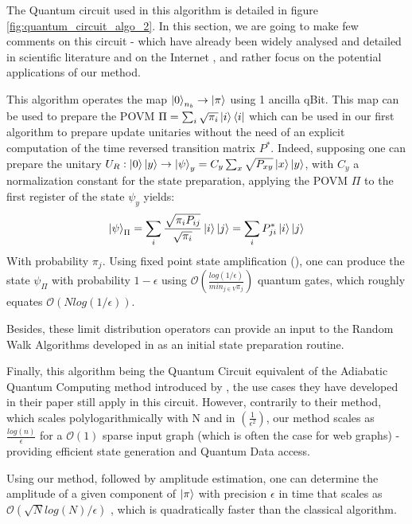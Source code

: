 \documentclass{article}
\begin{document}
The Quantum circuit used in this algorithm is detailed in figure \ref{fig:quantum_circuit_algo_2}. In this section, we are going to make few comments on this circuit - which have already been widely analysed and detailed in scientific literature and on the Internet \cite{Harrow_2009, Pan_2014, qiskit_hhl}, and rather focus on the potential applications of our method.

This algorithm operates the map $\ket{0}_{n_b} \rightarrow \ket{\pi}$ using 1 ancilla qBit. This map can be used to prepare the POVM $\Pi = \sum_i \sqrt{\pi_i} \ket{i}\bra{i}$ which can be used in our first algorithm to prepare update unitaries without the need of an explicit computation of the time reversed transition matrix $P^*$. Indeed, supposing one can prepare the unitary $U_R : \ket{0}\ket{y} \rightarrow \ket{\psi}_y = C_y \sum_x \sqrt{P_{xy}} \ket{x} \ket{y}$, with $C_y$ a normalization constant for the state preparation, applying the POVM $\Pi$ to the first register of the state $\psi_y$ yields:
\begin{equation}
    \ket{\psi}_\Pi = \sum_i \frac{\sqrt{\pi_i P_{ij}}}{\sqrt{\pi_i}} \ket{i}\ket{j} = \sum_i P_{ji}^* \ket{i}\ket{j}
\end{equation}
With probability $\pi_j$. Using fixed point state amplification (\cite{gilyén_su_low_wiebe_2019}), one can produce the state $\psi_\Pi$ with probability $1-\epsilon$ using $\mathcal{O}(\frac{log(1/\epsilon)}{min_{j\in V} \pi_j})$ quantum gates, which roughly equates $\mathcal{O}(N log(1/\epsilon))$. 

Besides, these limit distribution operators can provide an input to the Random Walk Algorithms developed in \cite{gilyén_su_low_wiebe_2019, Magniez_2011, Krovi_2015} as an initial state preparation routine.

Finally, this algorithm being the Quantum Circuit equivalent of the Adiabatic Quantum Computing method introduced by \cite{garnerone_zanardi_lidar_2012}, the use cases they have developed in their paper still apply in this circuit. However, contrarily to their method, which scales polylogarithmically with N and in $(\frac{1}{\epsilon^2})$, our method scales as $\frac{log(n)}{\epsilon}$ for a $\mathcal{O}(1)$ sparse input graph (which is often the case for web graphs) - providing efficient state generation and Quantum Data access. 

Using our method, followed by amplitude estimation, one can determine the amplitude of a given component of $\ket{\pi}$ with precision $\epsilon$ in time that scales as $\mathcal{O}(\sqrt{N}log(N) / \epsilon)$ \cite{brassard_høyer_mosca_tapp_2002}, which is quadratically faster than the classical algorithm.
\end{document}
